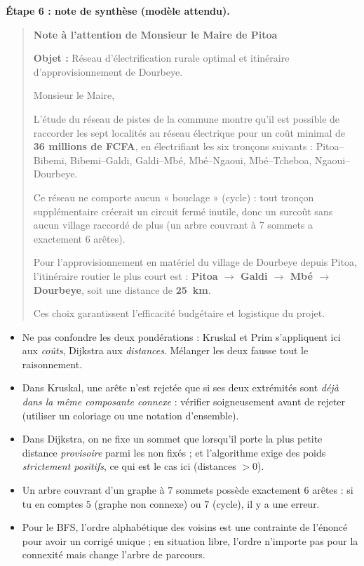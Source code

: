 \documentclass[11pt]{article}
\begin{document}
\begin{exoresolu}
\textbf{Étape 6 : note de synthèse (modèle attendu).}
\begin{quote}
\textbf{Note à l'attention de Monsieur le Maire de Pitoa}

\textbf{Objet :} Réseau d'électrification rurale optimal et itinéraire d'approvisionnement de Dourbeye.

Monsieur le Maire,

L'étude du réseau de pistes de la commune montre qu'il est possible de raccorder les sept localités au réseau électrique pour un coût minimal de \textbf{36 millions de FCFA}, en électrifiant les six tronçons suivants :
Pitoa–Bibemi, Bibemi–Galdi, Galdi–Mbé, Mbé–Ngaoui, Mbé–Tcheboa, Ngaoui–Dourbeye.

Ce réseau ne comporte aucun « bouclage » (cycle) : tout tronçon supplémentaire créerait un circuit fermé inutile, donc un surcoût sans aucun village raccordé de plus (un arbre couvrant à 7 sommets a exactement 6 arêtes).

Pour l'approvisionnement en matériel du village de Dourbeye depuis Pitoa, l'itinéraire routier le plus court est :
\textbf{Pitoa $\to$ Galdi $\to$ Mbé $\to$ Dourbeye}, soit une distance de \textbf{\SI{25}{km}}.

Ces choix garantissent l'efficacité budgétaire et logistique du projet.
\end{quote}
\end{exoresolu}

\begin{attention}
\begin{itemize}
\item Ne pas confondre les deux pondérations : Kruskal et Prim s'appliquent ici aux \emph{coûts}, Dijkstra aux \emph{distances}. Mélanger les deux fausse tout le raisonnement.
\item Dans Kruskal, une arête n'est rejetée que si ses deux extrémités sont \emph{déjà dans la même composante connexe} : vérifier soigneusement avant de rejeter (utiliser un coloriage ou une notation d'ensemble).
\item Dans Dijkstra, on ne fixe un sommet que lorsqu'il porte la plus petite distance \emph{provisoire} parmi les non fixés ; et l'algorithme exige des poids \emph{strictement positifs}, ce qui est le cas ici (distances $>0$).
\item Un arbre couvrant d'un graphe à $7$ sommets possède exactement $6$ arêtes : si tu en comptes $5$ (graphe non connexe) ou $7$ (cycle), il y a une erreur.
\item Pour le BFS, l'ordre alphabétique des voisins est une contrainte de l'énoncé pour avoir un corrigé unique ; en situation libre, l'ordre n'importe pas pour la connexité mais change l'arbre de parcours.
\end{itemize}
\end{attention}
\end{document}
